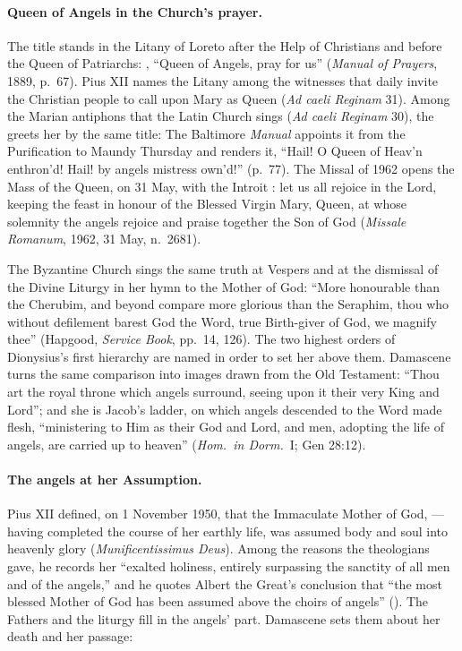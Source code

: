 \paragraph{Queen of Angels in the Church's prayer.} The title stands in the
Litany of Loreto after the Help of Christians and before the Queen of
Patriarchs: , ``Queen of Angels, pray for us''
(\emph{Manual of Prayers}, 1889, p.~67). Pius XII names the Litany among the
witnesses that daily invite the Christian people to call upon Mary as Queen
(\emph{Ad caeli Reginam} 31). Among the Marian antiphons that the Latin Church sings (\emph{Ad caeli
Reginam} 30), the  greets her by the same title:
 The Baltimore
\emph{Manual} appoints it from the Purification to Maundy Thursday and
renders it, ``Hail! O Queen of Heav'n enthron'd! Hail! by angels
mistress own'd!'' (p.~77). The Missal of 1962 opens the Mass of the Queen,
on 31 May, with the Introit : let us all rejoice in the Lord,
keeping the feast in honour of the Blessed Virgin Mary, Queen, at whose
solemnity the angels rejoice and praise together the Son of God
(\emph{Missale Romanum}, 1962, 31 May, n.~2681).

The Byzantine Church sings the same truth at Vespers and at the dismissal of
the Divine Liturgy in her hymn to the Mother of God: ``More honourable than the
Cherubim, and beyond compare more glorious than the Seraphim, thou who
without defilement barest God the Word, true Birth-giver of God, we magnify
thee'' (Hapgood, \emph{Service Book}, pp.~14, 126). The two highest orders of
Dionysius's first hierarchy are named in order to set her above them.
Damascene turns the same comparison into images drawn from the Old
Testament: ``Thou art the royal throne which angels surround, seeing upon it
their very King and Lord''; and she is Jacob's ladder, on which angels
descended to the Word made flesh, ``ministering to Him as their God and
Lord, and men, adopting the life of angels, are carried up to heaven''
(\emph{Hom.\ in Dorm.}\ I; Gen 28:12).

\paragraph{The angels at her Assumption.} Pius XII defined, on 1 November
1950, that the Immaculate Mother of God, ---having
completed the course of her earthly life, was assumed body and soul into
heavenly glory (\emph{Munificentissimus Deus}). Among the reasons the
theologians gave, he records her ``exalted holiness, entirely surpassing
the sanctity of all men and of the angels,'' and he quotes Albert the
Great's conclusion that ``the most blessed Mother of God has been assumed
above the choirs of angels'' (). The Fathers and the liturgy fill in the angels' part.
Damascene sets them about her death and her passage:

